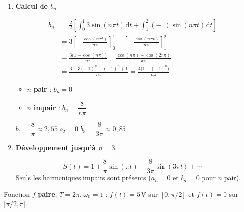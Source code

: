 \documentclass[a4paper,11pt]{article}
\begin{document}
\begin{enumerate}[label=\textbf{\arabic*.}]
\item \textbf{Calcul de $b_n$}
\begin{tcolorbox}[corrigebox]
\begin{align*}
b_n &= \frac{2}{2}\left[\int_0^1 3\sin(n\pi t)\,\mathrm{d}t + \int_1^2 (-1)\sin(n\pi t)\,\mathrm{d}t\right] \\
&= 3\left[-\frac{\cos(n\pi t)}{n\pi}\right]_0^1 - \left[-\frac{\cos(n\pi t)}{n\pi}\right]_1^2 \\
&= \frac{3\bigl(1-\cos(n\pi)\bigr)}{n\pi} - \frac{\cos(n\pi)-\cos(2n\pi)}{n\pi} \\
&= \frac{3-3(-1)^n - (-1)^n + 1}{n\pi} = \boxed{\frac{4\bigl(1-(-1)^n\bigr)}{n\pi}}
\end{align*}
\begin{itemize}[nosep]
  \item $n$ \textbf{pair} : $b_n = 0$
  \item $n$ \textbf{impair} : $b_n = \dfrac{8}{n\pi}$
\end{itemize}
$b_1 = \dfrac{8}{\pi} \approx 2{,}55$ \qquad $b_2 = 0$ \qquad $b_3 = \dfrac{8}{3\pi} \approx 0{,}85$
\end{tcolorbox}

\item \textbf{Développement jusqu'à $n = 3$}
\begin{tcolorbox}[corrigebox]
\[
  S(t) = 1 + \frac{8}{\pi}\sin(\pi t) + \frac{8}{3\pi}\sin(3\pi t) + \cdots
\]
Seuls les harmoniques impairs sont présents ($a_n=0$ et $b_n=0$ pour $n$ pair).
\end{tcolorbox}

\end{enumerate}

\newpage

\begin{tcolorbox}[exobox={Exercice 2 — Parité et Parseval}]
Fonction $f$ \textbf{paire}, $T = 2\pi$, $\omega_0 = 1$ : $f(t) = 5$\,V sur $[0,\pi/2]$ et $f(t) = 0$ sur $]\pi/2,\pi]$.
\end{tcolorbox}
\end{document}
